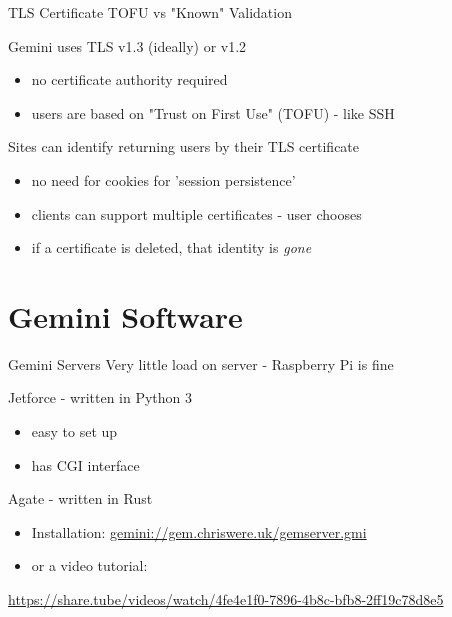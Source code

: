 \documentclass[presentation, 11pt,  aspectratio=169]{beamer}
\begin{document}
\begin{frame}[label={sec:org638f154}]{TLS Certificate TOFU vs "Known" Validation}
\begin{block}{Gemini uses TLS v1.3 (ideally) or v1.2}
\begin{itemize}
\item no certificate authority required\\
\item users are based on "Trust on First Use" (TOFU) - like SSH\\
\end{itemize}

\pause
\end{block}
\begin{block}{Sites can identify returning users by their TLS certificate}
\begin{itemize}
\item no need for cookies for 'session persistence'\\
\item clients can support multiple certificates - user chooses\\
\item if a certificate is deleted, that identity is \emph{gone}\\
\end{itemize}
\end{block}
\end{frame}

\section*{Gemini Software}
\label{sec:orga67528b}
\begin{frame}[label={sec:org969f7eb}]{Gemini Servers}
Very little load on server - Raspberry Pi is fine\\

\begin{block}{Jetforce - written in Python 3}
\begin{itemize}
\item easy to set up\\
\item has CGI interface\\
\end{itemize}
\end{block}

\begin{block}{Agate - written in Rust}
\begin{itemize}
\item Installation: \href{gemini://gem.chriswere.uk/gemserver.gmi}{gemini://gem.chriswere.uk/gemserver.gmi}\\
\item or a video tutorial:\\
\end{itemize}
\begin{small}
\url{https://share.tube/videos/watch/4fe4e1f0-7896-4b8c-bfb8-2ff19c78d8e5}\\
\end{small}
\end{block}
\end{frame}
\end{document}
